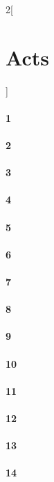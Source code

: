 \documentclass{book}
\begin{document}
\begin{multicols}{2}[\part{Acts}]
\subsection*{1}
\subsection*{2}
\subsection*{3}
\subsection*{4}
\subsection*{5}
\subsection*{6}
\subsection*{7}
\subsection*{8}
\subsection*{9}
\subsection*{10}
\subsection*{11}
\subsection*{12}
\subsection*{13}
\subsection*{14}

\end{multicols}
\end{document}
